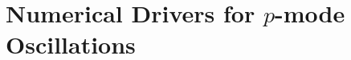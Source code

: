\documentclass[linenumbers]{aastex63}
\begin{document}







\section{Numerical Drivers for $p$-mode Oscillations}
 
 
\end{document}
